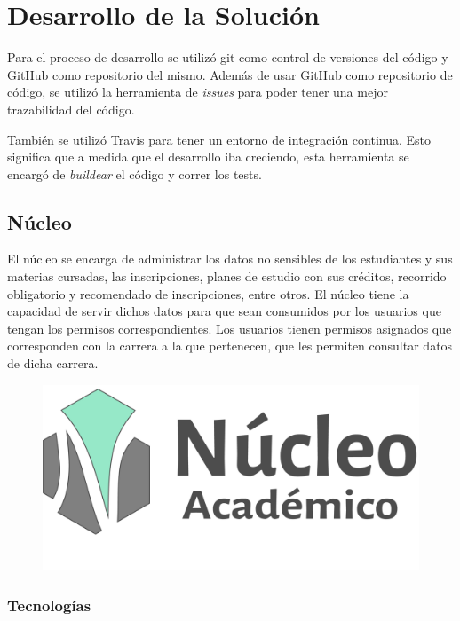 \chapter{Desarrollo de la Solución}
\label{sec:desarrollo}

Para el proceso de desarrollo se utilizó git como control de versiones del código y GitHub como repositorio del mismo. Además de usar GitHub como repositorio de código, se utilizó la herramienta de \textit{issues} para poder tener una mejor trazabilidad del código.

También se utilizó Travis para tener un entorno de integración continua. Esto significa que a medida que el desarrollo iba creciendo, esta herramienta se encargó de \textit{buildear} el código y correr los tests.  

\section[Núcleo]{Núcleo}

El núcleo se encarga de administrar los datos no sensibles de los estudiantes y sus materias cursadas, las inscripciones, planes de estudio con sus créditos, recorrido obligatorio y recomendado de inscripciones, entre otros.
El núcleo tiene la capacidad de servir dichos datos para que sean consumidos por los usuarios que tengan los permisos correspondientes.
Los usuarios tienen permisos asignados que corresponden con la carrera a la que pertenecen, que les permiten consultar datos de dicha carrera. 


\begin{figure}[h!]
  \centering
    \includegraphics[scale=0.5]{images/nucleo/nucleo-fondoblanco.png}
  \label{fig:django}
\end{figure}

\subsection{Tecnologías}

